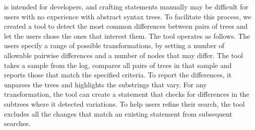 \lang is intended for developers, and crafting \lang statements manually may be difficult for users with no experience with abstract syntax trees. To facilitate this process, we created a tool to detect the most common differences between pairs of trees and let the users chose the ones that interest them. The tool operates as follows. The users specify a range of possible transformations, by setting a number of allowable pairwise differences and a number of nodes that may differ. The tool takes a sample from the log, compares all pairs of trees in that sample and reports those that match the specified criteria. To report the differences, it unparses the trees and highlights the substrings that vary. For any transformation, the tool can create a \lang statement that checks for differences in the subtrees where it detected variations. To help users refine their search, the tool excludes all the changes that match an existing \lang statement from subsequent searches.